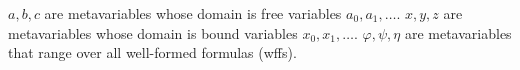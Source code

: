 $a, b, c$ are metavariables whose domain is free variables $a_0, a_1, \ldots$.
$x, y, z$ are metavariables whose domain is bound variables $x_0, x_1, \ldots$.
$\varphi, \psi, \eta$ are metavariables that range over all well-formed formulas (wffs).
